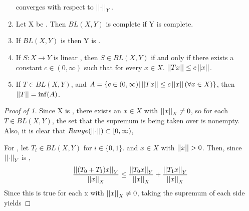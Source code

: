 \begin{prop}
\begin{enumerate}
    converges with respect to $\left|\left| \cdot \right|\right|_Y$. 
\item Let X be \NonDegenerate. Then $BL(X,Y)$ is complete if Y is complete. 
\item  If $BL(X,Y)$ is \NonDegenerate then Y is \NonDegenerate.
\item If $S:X \to Y$ is linear
	, then $S \in BL(X,Y)$ if and only if 
	there exists a constant $c \in (0,\infty)$ 
	such that for every 
	$x \in X$. 
	$\left|\left| Tx \right|\right| \leq c \left|\left| x \right|\right|$. 
\item If $T \in BL(X,Y)$, 
	and $A=\{c \in (0,\infty) | \left|\left| Tx \right|\right| \leq c \left|\left| x \right|\right| (\forall x \in X)\}$, then
	$\left|\left| T \right|\right|=\inf(A)$.
\end{enumerate}


\begin{proof}[Proof of 1] 
    Since X is \NonDegenerate, there exists an $x \in X$ with $\left|\left| x \right|\right|_X \neq 0$, 
    so for each $T \in BL(X,Y)$, the set that the supremum is being taken over is nonempty.
    Also, it is clear that $Range(\left|\left| \cdot \right|\right|) \subset [0,\infty)$, 

    For \Subadditivity, let $T_i \in BL(X,Y)$ for $i \in \{0,1\}$. and $x \in X$ with $\left|\left| x \right|\right| > 0$.
    Then, since $\left|\left| \cdot \right|\right|_Y$ is \Subadditive, 
    \begin{align*}
    \frac{\left|\left| (T_0+T_1)x \right|\right|_Y}{\left|\left| x \right|\right|_X} \leq \frac{\left|\left| T_0x \right|\right|_Y}{\left|\left| x \right|\right|_X}+ \frac{\left|\left| T_1x \right|\right|_Y}{\left|\left| x \right|\right|_X}
    \end{align*}
    Since this is true for each x with $\left|\left| x \right|\right|_X \neq 0$, taking the supremum of each side yields


\end{proof}
\end{prop}
